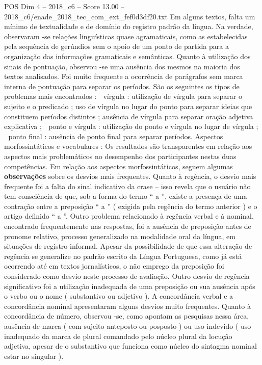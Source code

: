 \begin{textsample}{POS Dim 4 – 2018\_c6 – Score 13.00 – 2018\_c6/enade\_2018\_tec\_com\_ext\_fef0d3df20.txt}
Em alguns textos, falta um mínimo de textualidade e de domínio do registro padrão da língua.
Na verdade, observaram -se relações linguísticas quase agramaticais, como as estabelecidas pela sequência de gerúndios sem o apoio de um ponto de partida para a organização das informações gramaticais e semânticas.
Quanto à utilização dos sinais de pontuação, observou -se uma ausência dos mesmos na maioria dos textos analisados.
Foi muito frequente a ocorrência de parágrafos sem marca interna de pontuação para separar os períodos.
São os seguintes os tipos de problemas mais encontrados :  vírgula : utilização de vírgula para separar o sujeito e o predicado ; uso de vírgula no lugar do ponto para separar ideias que constituem períodos distintos ; ausência de vírgula para separar oração adjetiva explicativa ;  ponto e vírgula : utilização do ponto e vírgula no lugar de vírgula ;  ponto final : ausência de ponto final para separar períodos.
Aspectos morfossintáticos e vocabulares : Os resultados são transparentes em relação aos aspectos mais problemáticos no desempenho dos participantes nestas duas competências.
Em relação aos aspectos morfossintáticos, seguem algumas \textbf{observações} sobre os desvios mais frequentes.
Quanto à regência, o desvio mais frequente foi a falta do sinal indicativo da crase – isso revela que o usuário não tem consciência de que, sob a forma do termo “ a ”, existe a presença de uma contração entre a preposição “ a ” ( exigida pela regência do termo anterior ) e o artigo definido “ a ”.
Outro problema relacionado à regência verbal e à nominal, encontrado frequentemente nas respostas, foi a ausência de preposição antes de pronome relativo, processo generalizado na modalidade oral da língua, em situações de registro informal.
Apesar da possibilidade de que essa alteração de regência se generalize no padrão escrito da Língua Portuguesa, como já está ocorrendo até em textos jornalísticos, o não emprego da preposição foi considerado como desvio neste processo de avaliação.
Outro desvio de regência significativo foi a utilização inadequada de uma preposição ou sua ausência após o verbo ou o nome ( substantivo ou adjetivo ).
A concordância verbal e a concordância nominal apresentaram alguns desvios muito frequentes.
Quanto à concordância de número, observou -se, como apontam as pesquisas nessa área, ausência de marca ( com sujeito anteposto ou posposto ) ou uso indevido ( uso inadequado da marca de plural comandado pelo núcleo plural da locução adjetiva, apesar de o substantivo que funciona como núcleo do sintagma nominal estar no singular ).

\end{textsample}
